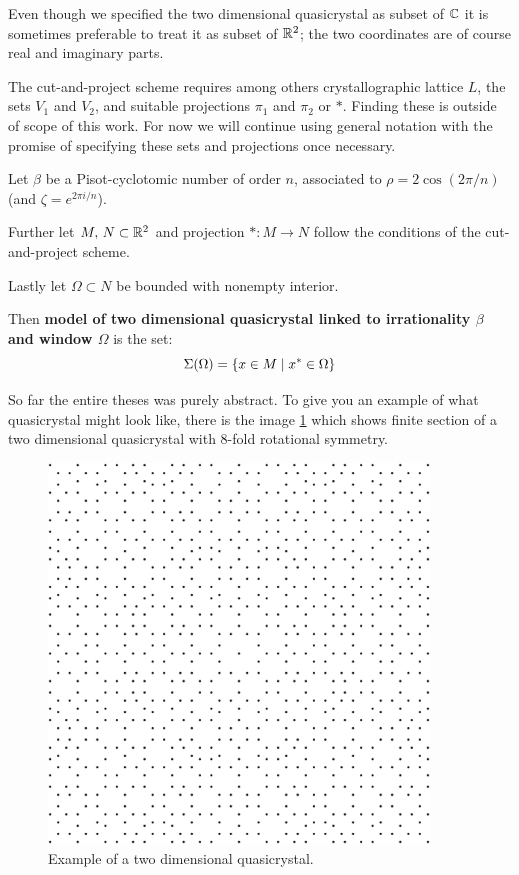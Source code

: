 \documentclass[text.tex]{subfiles}
\begin{document}
Even though we specified the two dimensional quasicrystal as subset of $\mathbb{C}$ it is sometimes preferable to treat it as subset of $\mathbb{R}^2$; the two coordinates are of course real and imaginary parts. 

The cut-and-project scheme requires among others crystallographic lattice $L$, the sets $V_1$ and $V_2$, and suitable projections $\pi_1$ and $\pi_2$ or $\ast$. Finding these is outside of scope of this work. For now we will continue using general notation with the promise of specifying these sets and projections once necessary. 

\begin{definition}\label{def_quasicrystal}
Let $\beta$ be a Pisot-cyclotomic number of order $n$, associated to $\rho = 2\cos\left(2\pi/n\right)$ (and $\zeta = e^{2\pi i/n}$). 

Further let $M,\, N\subset \mathbb{R}^2$ and projection $\ast:M\rightarrow N$ follow the conditions of the cut-and-project scheme.

Lastly let $\Omega\subset N$ be bounded with nonempty interior. 

Then \textbf{model of two dimensional quasicrystal linked to irrationality $\beta$ and window $\Omega$} is the set:
$$\Sigma(\Omega) = \{ x \in M\; |\; x^\ast\in \Omega\}$$
\end{definition}

So far the entire theses was purely abstract. To give you an example of what quasicrystal might look like, there is the image \ref{fig_quasicrystalFirstExample} which shows finite section of a two dimensional quasicrystal with $8$-fold rotational symmetry.

\begin{figure}[h]
\centering
\includegraphics[width=0.9\textwidth]{img/firstExample}
\caption{Example of a two dimensional quasicrystal.}
\label{fig_quasicrystalFirstExample}
\end{figure}
\end{document}
